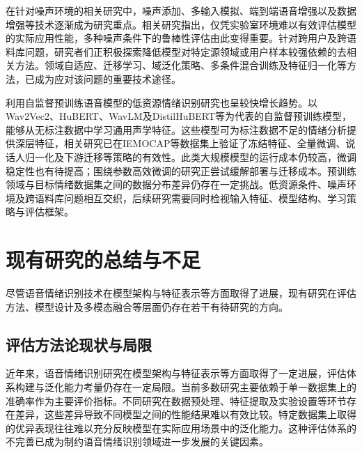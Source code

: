 在针对噪声环境的相关研究中，噪声添加、多输入模拟、端到端语音增强以及数据增强等技术逐渐成为研究重点\cite{leem2024selective,zhou2020using,tzeng2025noiserobust,lin2023chunk}。相关研究指出，仅凭实验室环境难以有效评估模型的实际应用性能，多种噪声条件下的鲁棒性评估由此变得重要\cite{su2023unsupervised,gao2024adversarial}。针对跨用户及跨语料库问题，研究者们正积极探索降低模型对特定源领域或用户样本较强依赖的去相关方法\cite{lu2022domain,ahn2025multitask}。领域自适应、迁移学习、域泛化策略、多条件混合训练及特征归一化等方法，已成为应对该问题的重要技术途径\cite{zhang2020transfer}。

利用自监督预训练语音模型的低资源情绪识别研究也呈较快增长趋势\cite{pepino2021wav2vec,morais2022sslfeatures,fang2023downstreamssl,thanh2024robust,sampath2025efficient}。以Wav2Vec2、HuBERT、WavLM及DistilHuBERT等为代表的自监督预训练模型，能够从无标注数据中学习通用声学特征\cite{baevski2020wav2vec2,hsu2021hubert,chen2022wavlm}。这些模型可为标注数据不足的情绪分析提供深层特征，相关研究已在IEMOCAP等数据集上验证了冻结特征、全量微调、说话人归一化及下游迁移等策略的有效性\cite{gat2022speakernorm}。此类大规模模型的运行成本仍较高，微调稳定性也有待提高；围绕参数高效微调的研究正尝试缓解部署与迁移成本\cite{feng2023peftser,lashkarashvili2024peftdomain}。预训练领域与目标情绪数据集之间的数据分布差异仍存在一定挑战\cite{gao2024adversarial}。低资源条件、噪声环境及跨语料库问题相互交织，后续研究需要同时检视输入特征、模型结构、学习策略与评估框架。


\section{现有研究的总结与不足}


尽管语音情绪识别技术在模型架构与特征表示等方面取得了进展，现有研究在评估方法、模型设计及多模态融合等层面仍存在若干有待研究的方向。

\subsection{评估方法论现状与局限}

近年来，语音情绪识别研究在模型架构与特征表示等方面取得了一定进展，评估体系构建与泛化能力考量仍存在一定局限\cite{liu2023dualrobustness,mao2022enhancing,su2023unsupervised}。当前多数研究主要依赖于单一数据集上的准确率作为主要评价指标。不同研究在数据预处理、特征提取及实验设置等环节存在差异，这些差异导致不同模型之间的性能结果难以有效比较\cite{ma2023review,lin2023chunk}。特定数据集上取得的优异表现往往难以充分反映模型在实际应用场景中的泛化能力。这种评估体系的不完善已成为制约语音情绪识别领域进一步发展的关键因素。


